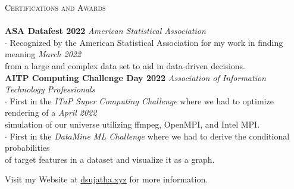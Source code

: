 \documentclass[a4paper]{article}
\newcommand{\lineunder} {
    \vspace*{-8pt} \\
    \hspace*{-18pt} \hrulefill \\
}
\newcommand{\header} [1] {
    {\hspace*{-18pt}\vspace*{6pt} \textsc{#1}}
    \vspace*{-6pt} \lineunder
}
\begin{document}
\header{Certifications and Awards}
\textbf{ASA Datafest 2022} \hfill \textit{American Statistical Association}\\
\vspace {1mm}
$\cdot$ Recognized by the American Statistical Association for my work in finding meaning \hfill \textit {March 2022}\\ from a large and complex data set to aid in data-driven decisions. \\
\vspace{2mm}
\textbf{AITP Computing Challenge Day 2022} \hfill \textit{Association of Information Technology Professionals}\\
\vspace {1mm}
$\cdot$ First in the \textit{ITaP Super Computing Challenge} where we had to optimize rendering of a \hfill \textit {April 2022}\\ simulation of our universe utilizing ffmpeg, OpenMPI, and Intel MPI. 
\vspace{2mm}\\
$\cdot$ First in the \textit{DataMine ML Challenge} where we had to derive the conditional probabilities\\ of target features in a dataset and visualize it as a graph.
\vspace*{6.94mm}

\centering Visit my Website at \href{https://dsujatha.xyz}{dsujatha.xyz} for more information.
\end{document}
